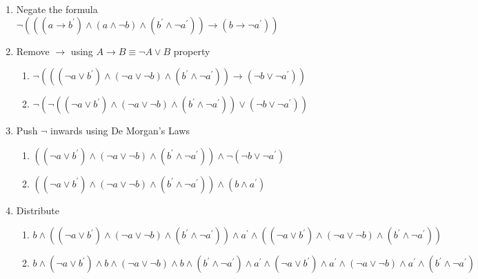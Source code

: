 \documentclass[a4paper, 14pt]{report}
\begin{document}
\begin{enumerate}

	\begin{enumerate}

		\item Negate the formula
			$ \neg (((a \rightarrow b^\prime) \wedge (a \wedge \neg b) \wedge (b^\prime \wedge \neg a^\prime)) \rightarrow (b \rightarrow \neg a^\prime)) $
		
		\item Remove $\rightarrow$ using $A \rightarrow B \equiv \neg A \vee B$ property

			\begin{enumerate}		
				\item $ \neg (((\neg a \vee b^\prime) \wedge (\neg a \vee \neg b) \wedge (b^\prime \wedge \neg a^\prime)) \rightarrow (\neg b \vee \neg a^\prime)) $ 
				\item $ \neg (\neg ((\neg a \vee b^\prime) \wedge (\neg a \vee \neg b) \wedge (b^\prime \wedge \neg a^\prime)) \vee (\neg b \vee \neg a^\prime)) $ 
			\end{enumerate}		

		\item Push $\neg$ inwards using De Morgan's Laws
		
			\begin{enumerate}		
				\item $ ((\neg a \vee b^\prime) \wedge (\neg a \vee \neg b) \wedge (b^\prime \wedge \neg a^\prime)) \wedge \neg (\neg b \vee \neg a^\prime) $
				\item $ ((\neg a \vee b^\prime) \wedge (\neg a \vee \neg b) \wedge (b^\prime \wedge \neg a^\prime)) \wedge (b \wedge a^\prime) $
			\end{enumerate}		

		\item Distribute

			\begin{enumerate}		
				\item $ b \wedge ((\neg a \vee b^\prime) \wedge (\neg a \vee \neg b) \wedge (b^\prime \wedge \neg a^\prime)) \wedge a^\prime \wedge  ((\neg a \vee b^\prime) \wedge (\neg a \vee \neg b) \wedge (b^\prime \wedge \neg a^\prime)) $ 
				\item $ b \wedge (\neg a \vee b^\prime) \wedge b \wedge (\neg a \vee \neg b) \wedge b \wedge (b^\prime \wedge \neg a^\prime) \wedge a^\prime \wedge (\neg a \vee b^\prime) \wedge a^\prime \wedge (\neg a \vee \neg b) \wedge a^\prime \wedge (b^\prime \wedge \neg a^\prime) $
			\end{enumerate}		


\end{enumerate}
\end{enumerate}
\end{document}
